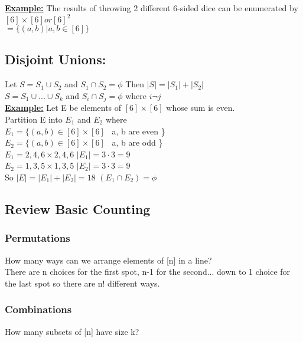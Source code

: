 \documentclass[12pt]{article}
\newcommand{\myt}[1]{\textbf{\underline{#1}}}
\begin{document}
	\myt{Example:} The results of throwing 2 different 6-sided dice can be enumerated by $[6] \times [6] or [6]^2$\\
	$ = \{(a, b) | a, b \in [6]\}$\\
	
	\subsection*{Disjoint Unions:}
	Let $S = S_1 \cup S_2$ and $S_1 \cap S_2 = \phi$ Then $|S| = |S_1| + |S_2|$\\
	
	$S = S_1 \cup ... \cup S_k$ and $S_i \cap S_j = \phi$ where $i \neg j$\\
	
	\myt{Example:} Let E be elements of $[6] \times [6]$ whose sum is even.\\
	
	Partition E into $E_1$ and $E_2$ where\\
	
	$E_1 = \{(a, b) \in [6] \times [6]$ \vline \ a, b are even \}\\
	$E_2 = \{(a, b) \in [6] \times [6]$ \vline \ a, b are odd \}\\
	
	$E_1 = {2, 4, 6} \times {2, 4, 6}$ $|E_1| = 3 \cdot 3 = 9$\\
	$E_2 = {1, 3, 5} \times {1, 3, 5}$ $|E_2| = 3 \cdot 3 = 9$\\
	
	So $|E| = |E_1| + |E_2| = 18$ $(E_1 \cap E_2) = \phi$
	
	\subsection*{Review Basic Counting}
	\subsubsection*{Permutations}
	How many ways can we arrange elements of [n] in a line?\\
	
	There are n choices for the first spot, n-1 for the second... down to 1 choice for the last spot so there are n! different ways.\\
	
	\subsubsection*{Combinations}
	How many subsets of [n] have size k?\\
	
\end{document}
